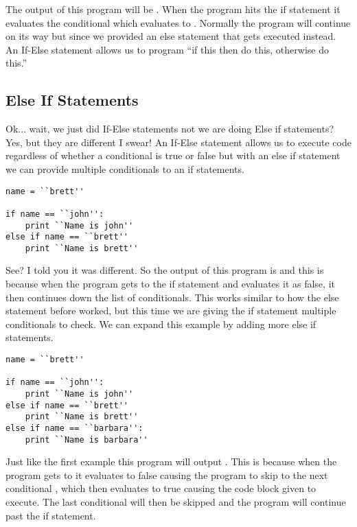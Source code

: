 The output of this program will be .
When the program hits the if statement it evaluates the conditional  which evaluates to .
Normally the program will continue on its way but since we provided an else statement that gets executed instead.
An If-Else statement allows us to program ``if this then do this, otherwise do this.''

\subsection{Else If Statements}
Ok... wait, we just did If-Else statements not we are doing Else if statements?
Yes, but they are different I swear!
An If-Else statement allows us to execute code regardless of whether a conditional is true or false but with an else if statement we can provide multiple conditionals to an if statements.

\begin{lstlisting}[caption={Else If Statement}]
name = ``brett''

if name == ``john'':
    print ``Name is john''
else if name == ``brett''
    print ``Name is brett''
\end{lstlisting}

See? I told you it was different.
So the output of this program is  and this is because when the program gets to the if statement and evaluates it as false, it then continues down the list of conditionals.
This works similar to how the else statement before worked, but this time we are giving the if statement multiple conditionals to check.
We can expand this example by adding more else if statements.

\begin{lstlisting}[caption={Else If Statement 2}]
name = ``brett''

if name == ``john'':
    print ``Name is john''
else if name == ``brett''
    print ``Name is brett''
else if name == ``barbara'':
    print ``Name is barbara''
\end{lstlisting}

Just like the first example this program will output .
This is because when the program gets to  it evaluates to false causing the program to skip to the next conditional , which then evaluates to true causing the code block given to execute.
The last conditional  will then be skipped and the program will continue past the if statement.
\par

